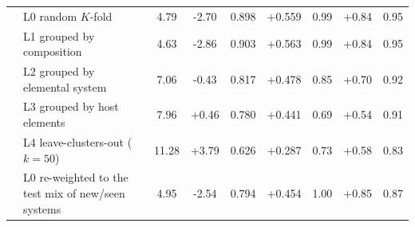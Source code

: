 \begin{table}[t]
\begin{tabular}{ll S[table-format=2.2] S[table-format=-2.2] S[table-format=1.3] S[table-format=-1.3] S[table-format=1.2] S[table-format=-1.2] S[table-format=1.2]}
 & L0 random $K$-fold & 4.79 & -2.70 & 0.898 & +0.559 & 0.99 & +0.84 & 0.95 \\
 & L1 grouped by composition & 4.63 & -2.86 & 0.903 & +0.563 & 0.99 & +0.84 & 0.95 \\
 & L2 grouped by elemental system & 7.06 & -0.43 & 0.817 & +0.478 & 0.85 & +0.70 & 0.92 \\
 & L3 grouped by host elements & 7.96 & +0.46 & 0.780 & +0.441 & 0.69 & +0.54 & 0.91 \\
 & L4 leave-clusters-out ($k=50$) & 11.28 & +3.79 & 0.626 & +0.287 & 0.73 & +0.58 & 0.83 \\
 & L0 re-weighted to the test mix of new/seen systems & 4.95 & -2.54 & 0.794 & +0.454 & 1.00 & +0.85 & 0.87 \\
\bottomrule
\end{tabular}
\end{table}
